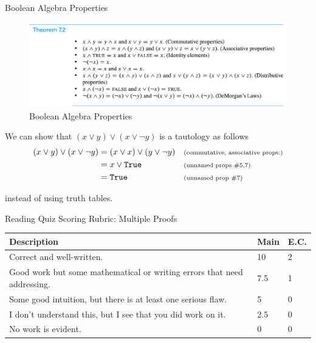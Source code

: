 \documentclass[10pt]{beamer}
\begin{document}
\begin{frame}{Boolean Algebra Properties}
\footnotesize 
\begin{figure}[ht]
        \centering
        \includegraphics[width=\textwidth]{images/boolean_algebra_properties}
        \caption{Boolean Algebra Properties}
        \label{fig:bap}
\end{figure}

\vfill 

\begin{myredbox}[title=Example application]

We can show that $(x \lor y) \lor (x \lor \lnot y)$ is a tautology as follows
%
\begin{align*}
(x \lor y) \lor (x \lor \lnot y) &= 	(x \lor x) \lor (y \lor \lnot y) && \text{\scriptsize{{(commutative, associative props.)}}} \\
&= x \lor \texttt{True} && \text{\scriptsize{{(unnamed props \#5,7)}}} \\
&= \texttt{True} && \text{\scriptsize{{(unnamed prop \#7)}}}
\end{align*}

instead of using truth tables.
\end{myredbox}	
\end{frame}



\begin{frame}{Reading Quiz Scoring Rubric: Multiple Proofs}

\begin{myredbox}[title=Scoring rubric (out of 10 points)]
\begin{tabularx}{\textwidth}{|X|L{1cm}|L{1cm}|}
\hline 
\textbf{Description} & \textbf{Main} & \textbf{E.C.} \\
\hline 
Correct and well-written. &10 & 2 \\
 Good work but some mathematical or writing errors that need addressing. &7.5& 1\\
Some good intuition, but there is at least one serious flaw. &5 &0  \\
I don't understand this, but I see that you did work on it. &2.5& 0  \\
No work is evident.	&0&0  \\
\hline
\end{tabularx}
\end{myredbox}
\end{frame}
\end{document}

